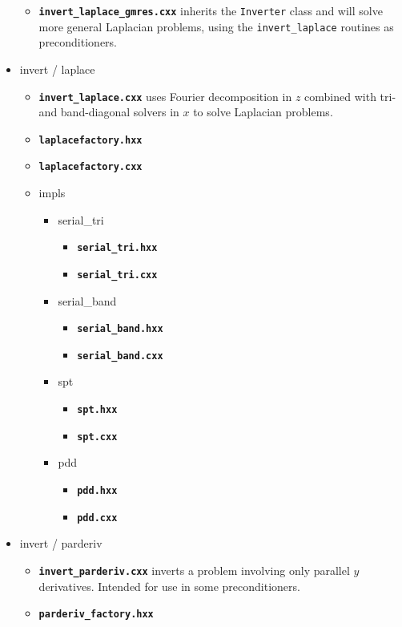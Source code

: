 \documentclass[12pt]{article}
\newcommand{\code}[1]{\texttt{#1}}
\newcommand{\file}[1]{\texttt{\bf #1}}
\begin{document}
\begin{itemize}
\begin{itemize}
  \item \file{invert\_laplace\_gmres.cxx} inherits the \code{Inverter} class
    and will solve more general Laplacian problems, using the
    \code{invert\_laplace} routines as preconditioners.
  \end{itemize}
\item invert / laplace
  \begin{itemize}
  \item \file{invert\_laplace.cxx} uses Fourier decomposition in $z$ combined
    with tri- and band-diagonal solvers in $x$ to solve Laplacian problems.
  \item \file{laplacefactory.hxx}
  \item \file{laplacefactory.cxx}
  \item impls
    \begin{itemize}
    \item serial\_tri
      \begin{itemize}
      \item \file{serial\_tri.hxx}
      \item \file{serial\_tri.cxx}
      \end{itemize}
    \item serial\_band
      \begin{itemize}
      \item \file{serial\_band.hxx}
      \item \file{serial\_band.cxx}
      \end{itemize}
    \item spt
      \begin{itemize}
      \item \file{spt.hxx}
      \item \file{spt.cxx}
      \end{itemize}
    \item pdd
      \begin{itemize}
      \item \file{pdd.hxx}
      \item \file{pdd.cxx}
      \end{itemize}
    \end{itemize}
  \end{itemize}
\item invert / parderiv
  \begin{itemize}
  \item \file{invert\_parderiv.cxx} inverts a problem involving only parallel
    $y$ derivatives. Intended for use in some preconditioners.
  \item \file{parderiv\_factory.hxx}

\end{itemize}
\end{itemize}
\end{document}
